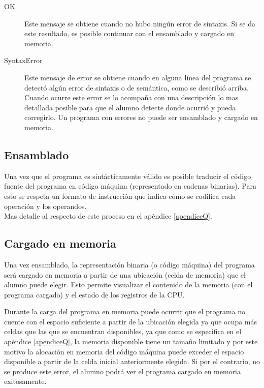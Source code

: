 \begin{description}
\item[OK] Este mensaje se obtiene cuando no hubo ningún error de sintaxis. Si se da este resultado, es posible continuar con el ensamblado y cargado en memoria.
\item[SyntaxError] Este mensaje de error se obtiene cuando en alguna línea del programa se detectó algún error de sintaxis o de semántica, como se describió arriba. Cuando ocurre este error se lo acompaña con una descripción lo mas detallada posible para que el alumno detecte donde ocurrió y pueda corregirlo. Un programa con errores no puede ser ensamblado y cargado en memoria.
\end{description}

\subsection{Ensamblado}

Una vez que el programa es sintácticamente válido es posible traducir el código fuente del programa en código máquina (representado en cadenas binarias). Para esto se respeta un formato de instrucción que indica cómo se codifica cada operación y los operandos. \\
Mas detalle al respecto de este proceso en el apéndice \ref{apendiceQ}.

\subsection{Cargado en memoria}

Una vez ensamblado, la representación binaria (o código máquina) del programa será cargado en memoria a partir de una ubicación (celda de memoria) que el alumno puede elegir. Esto permite visualizar el contenido de la memoria (con el programa cargado) y el estado de los registros de la CPU. 

Durante la carga del programa en memoria puede ocurrir que el programa no cuente con el espacio suficiente a partir de la ubicación elegida ya que ocupa más celdas que las que se encuentran disponibles, ya que como se especifica en el apéndice \ref{apendiceQ}, la memoria disponible tiene un tamaño limitado y por este motivo la alocación en memoria del código máquina puede exceder el espacio disponible a partir de la celda inicial anteriormente elegida. Si por el contrario, no se produce este error, el alumno podrá ver el programa cargado en memoria exitosamente.

